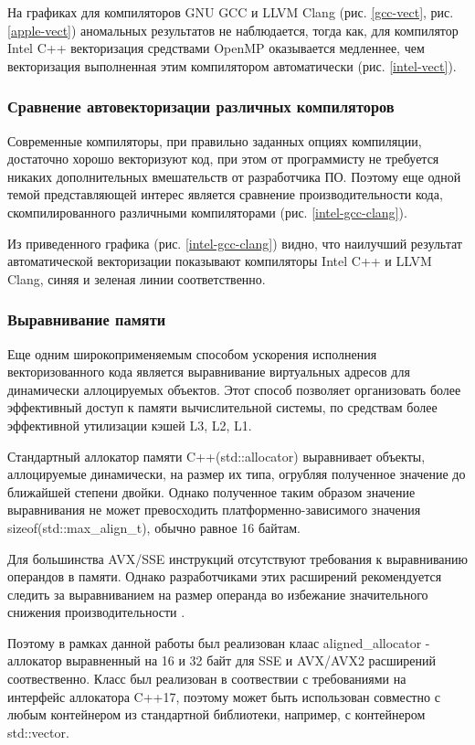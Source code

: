 На графиках для компиляторов GNU GCC и LLVM Clang (рис. \ref{gcc-vect}, рис. \ref{apple-vect}) аномальных результатов не наблюдается,
тогда как, для компилятор Intel C++ векторизация средствами OpenMP оказывается медленнее, чем векторизация выполненная
этим компилятором автоматически (рис. \ref{intel-vect}).

\subsubsection{Сравнение автовекторизации различных компиляторов}

Современные компиляторы, при правильно заданных опциях компиляции, достаточно хорошо векторизуют код,
при этом от программисту не требуется никаких дополнительных вмешательств от разработчика ПО.
Поэтому еще одной темой представляющей интерес является сравнение производительности кода,
скомпилированного различными компиляторами (рис. \ref{intel-gcc-clang}).


Из приведенного графика (рис. \ref{intel-gcc-clang}) видно, что наилучший результат автоматической векторизации показывают
компиляторы Intel C++ и LLVM Clang, синяя и зеленая линии соответственно.

\subsubsection{Выравнивание памяти}

Еще одним широкоприменяемым способом ускорения исполнения векторизованного кода является выравнивание виртуальных адресов
для динамически аллоцируемых объектов. Этот способ позволяет организовать более эффективный доступ к памяти вычислительной системы,
по средствам более эффективной утилизации кэшей L3, L2, L1.

Стандартный аллокатор памяти C++(std::allocator) выравнивает объекты, аллоцируемые динамически, на размер их типа,
огрубляя полученное значение до ближайшей степени двойки.
Однако полученное таким образом значение выравнивания не может превосходить платформенно-зависимого значения sizeof(std::max\_align\_t),
обычно равное 16 байтам.

Для большинства AVX/SSE инструкций отсутствуют требования к выравниванию операндов в памяти. 
Однако разработчиками этих расширений рекомендуется следить за выравниванием на размер операнда
во избежание значительного снижения производительности \cite{intel}.

Поэтому в рамках данной работы был реализован клаас aligned\_allocator - аллокатор выравненный
на 16 и 32 байт для SSE и AVX/AVX2 расширений соотвественно.
Класс был реализован в соотвествии с требованиями на интерфейс аллокатора C++17, поэтому может быть использован совместно с любым
контейнером из стандартной библиотеки, например, с контейнером std::vector.

\clearpage
